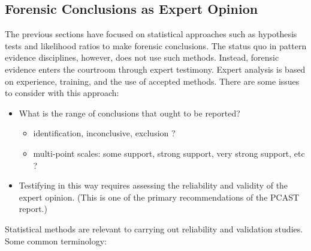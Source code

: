 \documentclass[]{book}
\providecommand{\tightlist}{%
  \setlength{\itemsep}{0pt}\setlength{\parskip}{0pt}}
\theoremstyle{definition}
\theoremstyle{definition}
\theoremstyle{remark}
\begin{document}
\subsection{Forensic Conclusions as Expert
Opinion}\label{forensic-conclusions-as-expert-opinion}

The previous sections have focused on statistical approaches such as
hypothesis tests and likelihood ratios to make forensic conclusions. The
status quo in pattern evidence disciplines, however, does not use such
methods. Instead, forensic evidence enters the courtroom through expert
testimony. Expert analysis is based on experience, training, and the use
of accepted methods. There are some issues to consider with this
approach:

\begin{itemize}
\tightlist
\item
  What is the range of conclusions that ought to be reported?

  \begin{itemize}
  \tightlist
  \item
    identification, inconclusive, exclusion ?
  \item
    multi-point scales: some support, strong support, very strong
    support, etc ?
  \end{itemize}
\item
  Testifying in this way requires assessing the reliability and validity
  of the expert opinion. (This is one of the primary recommendations of
  the PCAST report.)
\end{itemize}

Statistical methods are relevant to carrying out reliability and
validation studies. Some common terminology:
\end{document}
